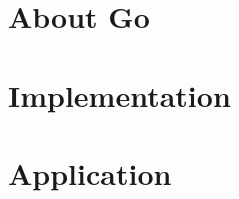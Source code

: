 \documentclass[%
  a4paper,
  twoside,
  numbers=noenddot,
  parskip=half,
  open=any,
  headsepline,
  english, %
  ba  %
]{zhawthesis}
\begin{document}
\chapter{About Go}
\label{ch:about-go}


%

\label{ch:methodology} %


\chapter{Implementation}
\label{ch:implementation} %


\chapter{Application}
\label{ch:application} %


\label{ch:results} %


\label{ch:discussion} %

\end{document}
